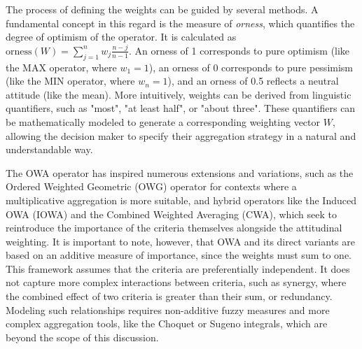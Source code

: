 The process of defining the weights can be guided by several methods. A fundamental concept in this regard is the measure of \textit{orness}, which quantifies the degree of optimism of the operator. It is calculated as $\text{orness}(W) = \sum_{j=1}^{n} w_j \frac{n-j}{n-1}$. An orness of 1 corresponds to pure optimism (like the MAX operator, where $w_1=1$), an orness of 0 corresponds to pure pessimism (like the MIN operator, where $w_n=1$), and an orness of 0.5 reflects a neutral attitude (like the mean). More intuitively, weights can be derived from linguistic quantifiers, such as "most", "at least half", or "about three". These quantifiers can be mathematically modeled to generate a corresponding weighting vector $W$, allowing the decision maker to specify their aggregation strategy in a natural and understandable way.

The OWA operator has inspired numerous extensions and variations, such as the Ordered Weighted Geometric (OWG) operator for contexts where a multiplicative aggregation is more suitable, and hybrid operators like the Induced OWA (IOWA) and the Combined Weighted Averaging (CWA), which seek to reintroduce the importance of the criteria themselves alongside the attitudinal weighting. It is important to note, however, that OWA and its direct variants are based on an additive measure of importance, since the weights must sum to one. This framework assumes that the criteria are preferentially independent. It does not capture more complex interactions between criteria, such as synergy, where the combined effect of two criteria is greater than their sum, or redundancy. Modeling such relationships requires non-additive fuzzy measures and more complex aggregation tools, like the Choquet or Sugeno integrals, which are beyond the scope of this discussion.